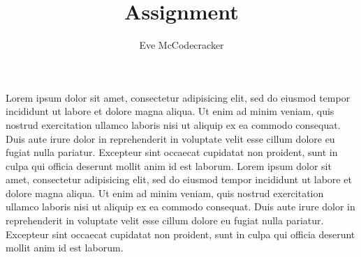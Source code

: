 \documentclass[a4paper, 12pt, twosided, signature]{ucmaths}
\title{Assignment}
\author{Eve McCodecracker}
\begin{document}
    \maketitle
    Lorem ipsum dolor sit amet, consectetur adipisicing elit, sed do eiusmod tempor incididunt ut labore et dolore magna aliqua. Ut enim ad minim veniam, quis nostrud exercitation ullamco laboris nisi ut aliquip ex ea commodo consequat. Duis aute irure dolor in reprehenderit in voluptate velit esse cillum dolore eu fugiat nulla pariatur. Excepteur sint occaecat cupidatat non proident, sunt in culpa qui officia deserunt mollit anim id est laborum.
    \clearpage
    Lorem ipsum dolor sit amet, consectetur adipisicing elit, sed do eiusmod tempor incididunt ut labore et dolore magna aliqua. Ut enim ad minim veniam, quis nostrud exercitation ullamco laboris nisi ut aliquip ex ea commodo consequat. Duis aute irure dolor in reprehenderit in voluptate velit esse cillum dolore eu fugiat nulla pariatur. Excepteur sint occaecat cupidatat non proident, sunt in culpa qui officia deserunt mollit anim id est laborum.
\end{document}
